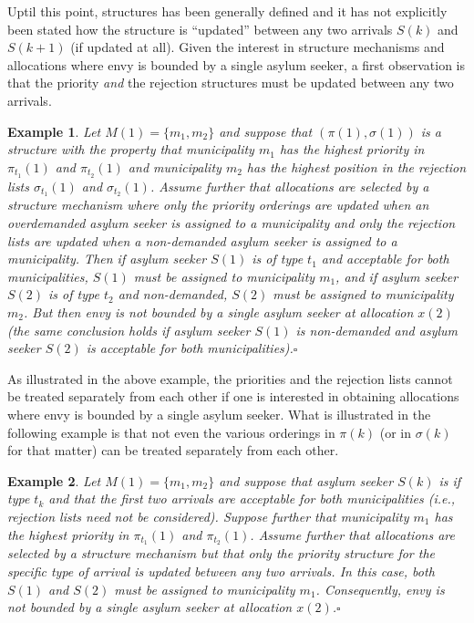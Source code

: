\documentclass[12pt,fleqn]{article}
\newtheorem{example}{Example}
\begin{document}
\noindent Uptil this point, structures has been generally defined and it has not explicitly been stated how the structure is ``updated'' between any two arrivals $S(k)$ and $S(k+1)$ (if updated at all). Given the interest in structure mechanisms and allocations where envy is bounded by a single asylum seeker, a first observation is that the priority \emph{and} the rejection structures must be updated between any two arrivals.
\begin{example}\rm
Let $M(1)=\{m_1,m_2\}$ and suppose that $(\pi(1),\sigma(1))$ is a structure with the property that municipality $m_1$ has the highest priority in $\pi_{t_1}(1)$ and $\pi_{t_2}(1)$ and municipality $m_2$ has the highest position in the rejection lists $\sigma_{t_1}(1)$ and $\sigma_{t_2}(1)$. Assume further that allocations are selected by a structure mechanism where \emph{only} the priority orderings are updated when an overdemanded asylum seeker is assigned to a municipality and \emph{only} the rejection lists are updated when a non-demanded asylum seeker is assigned to a municipality. Then if asylum seeker $S(1)$ is of type $t_1$ and acceptable for both municipalities, $S(1)$ must be assigned to municipality $m_1$, and if asylum seeker $S(2)$ is of type $t_2$ and non-demanded, $S(2)$ must be assigned to municipality $m_2$. But then envy is not bounded by a single asylum seeker at allocation $x(2)$ (the same conclusion holds if asylum seeker $S(1)$ is non-demanded and asylum seeker $S(2)$ is acceptable for both municipalities).\hfill$\square$
\end{example}

\noindent As illustrated in the above example, the priorities and the rejection lists cannot be treated separately from each other if one is interested in obtaining allocations where envy is bounded by a single asylum seeker. What is illustrated in the following example is that not even the various orderings in $\pi(k)$ (or in $\sigma(k)$ for that matter) can be treated separately from each other.

\begin{example}\rm
Let $M(1)=\{m_1,m_2\}$ and suppose that asylum seeker $S(k)$ is if type $t_k$ and that the first two arrivals are acceptable for both municipalities (i.e., rejection lists need not be considered). Suppose further that municipality $m_1$ has the highest priority in $\pi_{t_1}(1)$ and $\pi_{t_2}(1)$. Assume further that allocations are selected by a structure mechanism but that \emph{only} the priority structure for the specific type of arrival is updated between any two arrivals. In this case, both $S(1)$ and $S(2)$ must be assigned to municipality $m_1$. Consequently, envy is not bounded by a single asylum seeker at allocation $x(2)$.\hfill $\square$
\end{example}
\end{document}
